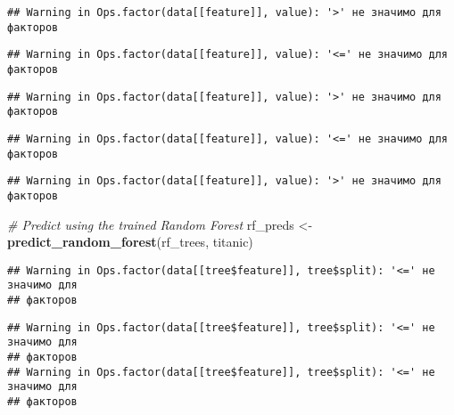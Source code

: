 \documentclass[
]{article}
\newenvironment{Shaded}{\begin{snugshade}}{\end{snugshade}}
\newcommand{\AttributeTok}[1]{\textcolor[rgb]{0.13,0.29,0.53}{#1}}
\newcommand{\CommentTok}[1]{\textcolor[rgb]{0.56,0.35,0.01}{\textit{#1}}}
\newcommand{\ControlFlowTok}[1]{\textcolor[rgb]{0.13,0.29,0.53}{\textbf{#1}}}
\newcommand{\FunctionTok}[1]{\textcolor[rgb]{0.13,0.29,0.53}{\textbf{#1}}}
\newcommand{\NormalTok}[1]{#1}
\newcommand{\OtherTok}[1]{\textcolor[rgb]{0.56,0.35,0.01}{#1}}
\newcommand{\SpecialCharTok}[1]{\textcolor[rgb]{0.81,0.36,0.00}{\textbf{#1}}}
\begin{document}
\begin{verbatim}
## Warning in Ops.factor(data[[feature]], value): '>' не значимо для факторов
\end{verbatim}

\begin{verbatim}
## Warning in Ops.factor(data[[feature]], value): '<=' не значимо для факторов
\end{verbatim}

\begin{verbatim}
## Warning in Ops.factor(data[[feature]], value): '>' не значимо для факторов
\end{verbatim}

\begin{verbatim}
## Warning in Ops.factor(data[[feature]], value): '<=' не значимо для факторов
\end{verbatim}

\begin{verbatim}
## Warning in Ops.factor(data[[feature]], value): '>' не значимо для факторов
\end{verbatim}

\begin{Shaded}
\begin{Highlighting}[]
\CommentTok{\# Predict using the trained Random Forest}
\NormalTok{rf\_preds }\OtherTok{\textless{}{-}} \FunctionTok{predict\_random\_forest}\NormalTok{(rf\_trees, titanic)}
\end{Highlighting}
\end{Shaded}

\begin{verbatim}
## Warning in Ops.factor(data[[tree$feature]], tree$split): '<=' не значимо для
## факторов
\end{verbatim}

\begin{verbatim}
## Warning in Ops.factor(data[[tree$feature]], tree$split): '<=' не значимо для
## факторов
## Warning in Ops.factor(data[[tree$feature]], tree$split): '<=' не значимо для
## факторов
\end{verbatim}

\begin{Shaded}
\end{Shaded}
\end{document}
